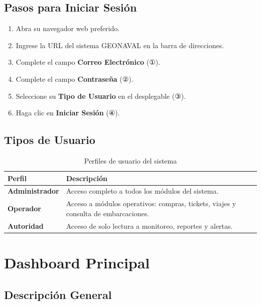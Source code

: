 \documentclass[12pt,a4paper]{report}
\begin{document}
\section{Pasos para Iniciar Sesión}

\begin{enumerate}
  \item Abra su navegador web preferido.
  \item Ingrese la URL del sistema GEONAVAL en la barra de direcciones.
  \item Complete el campo \textbf{Correo Electrónico} (①).
  \item Complete el campo \textbf{Contraseña} (②).
  \item Seleccione su \textbf{Tipo de Usuario} en el desplegable (③).
  \item Haga clic en \textbf{Iniciar Sesión} (④).
\end{enumerate}

\section{Tipos de Usuario}

\begin{table}[H]
  \centering
  \renewcommand{\arraystretch}{1.4}
  \begin{tabularx}{\textwidth}{@{}L{4cm} X@{}}
    \toprule
    \textbf{Perfil} & \textbf{Descripción} \\
    \midrule
    \textbf{Administrador} & Acceso completo a todos los módulos del sistema. \\
    \textbf{Operador} & Acceso a módulos operativos: compras, tickets, viajes y consulta de embarcaciones. \\
    \textbf{Autoridad} & Acceso de solo lectura a monitoreo, reportes y alertas. \\
    \bottomrule
  \end{tabularx}
  \caption{Perfiles de usuario del sistema}
\end{table}

\chapter{Dashboard Principal}

\section{Descripción General}
\end{document}
